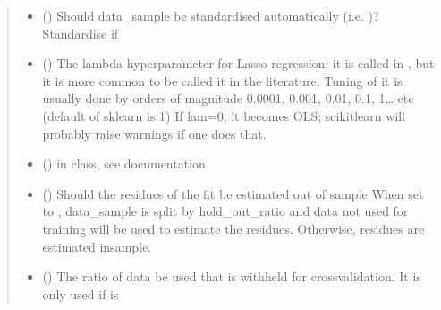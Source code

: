 \documentclass[letterpaper,10pt,english]{sphinxmanual}
\begin{document}
\begin{fulllineitems}
\begin{quote}
\begin{description}
\begin{itemize}
\item {}
\sphinxAtStartPar
{} () \textendash{} Should data\_sample be standardised automatically
(i.e.  )? Standardise if 

\item {}
\sphinxAtStartPar
{} () \textendash{} The lambda hyperparameter for Lasso regression;
it is called  in , but it is more common
to be called it  in the literature.
Tuning of it is usually done by orders of magnitude
0.0001, 0.001, 0.01, 0.1, 1… etc (default of sklearn is 1)
If lam=0, it becomes OLS; scikit\sphinxhyphen{}learn will probably raise
warnings if one does that.

\item {}
\sphinxAtStartPar
{} () \textendash{}  in   class,
see  documentation

\item {}
\sphinxAtStartPar
{} () \textendash{} Should the residues of the fit be estimated out of sample
When set to , data\_sample is split by hold\_out\_ratio
and data not used for training will be used to estimate
the residues. Otherwise, residues are estimated in\sphinxhyphen{}sample.

\item {}
\sphinxAtStartPar
{} () \textendash{} The ratio of data be used that is withheld for
cross\sphinxhyphen{}validation. It is only used if 
is 


\end{itemize}
\end{description}
\end{quote}
\end{fulllineitems}
\end{document}
